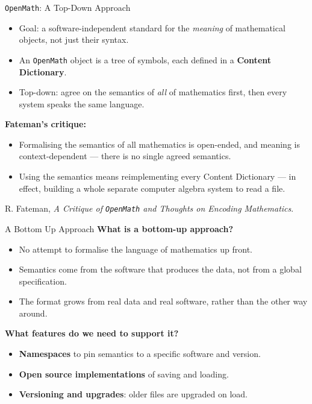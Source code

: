 \documentclass[9pt]{beamer}
\begin{document}
\begin{frame}[fragile]{\texttt{OpenMath}: A Top-Down Approach}
  \begin{itemize}
  \item Goal: a software-independent standard for the \emph{meaning} of
    mathematical objects, not just their syntax. \pause
  \item An \texttt{OpenMath} object is a tree of symbols, each defined in a
    \textbf{Content Dictionary}. \pause
  \item Top-down: agree on the semantics of \emph{all} of mathematics first,
    then every system speaks the same language. \pause
  \end{itemize}
  \textbf{Fateman's critique:}
  \begin{itemize}
  \item Formalising the semantics of all mathematics is open-ended, and meaning
    is context-dependent --- there is no single agreed semantics. \pause
  \item Using the semantics means reimplementing every Content Dictionary ---
    in effect, building a whole separate computer algebra system to read a file.
  \end{itemize}
  \vfill
  {\footnotesize R. Fateman, \emph{A Critique of \texttt{OpenMath} and Thoughts
    on Encoding Mathematics}.}
\end{frame}


\begin{frame}[fragile]{A Bottom Up Approach}
  \textbf{What is a bottom-up approach?} \pause
  \begin{itemize}
  \item No attempt to formalise the language of mathematics up front. \pause
  \item Semantics come from the software that produces the data, not from a
    global specification. \pause
  \item The format grows from real data and real software, rather than the
    other way around. \pause
  \end{itemize}
  \vfill
  \textbf{What features do we need to support it?} \pause
  \begin{itemize}
  \item \textbf{Namespaces} to pin semantics to a specific software and version. \pause
  \item \textbf{Open source implementations} of saving and loading. \pause
  \item \textbf{Versioning and upgrades}: older files are upgraded on load. \pause
  \end{itemize}
\end{frame}
\end{document}
